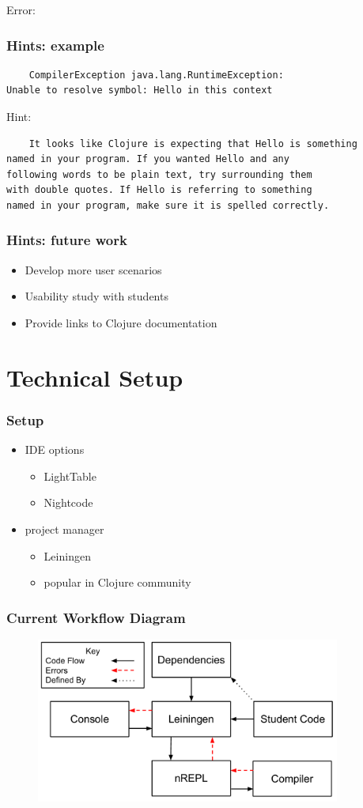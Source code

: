 \documentclass{beamer}
\begin{document}
\begin{frame}[fragile]
Error:
\frametitle{Hints: example}
  	 \begin{verbatim}
	CompilerException java.lang.RuntimeException:
Unable to resolve symbol: Hello in this context
	\end{verbatim}
Hint:
	\begin{verbatim}
	It looks like Clojure is expecting that Hello is something
named in your program. If you wanted Hello and any
following words to be plain text, try surrounding them
with double quotes. If Hello is referring to something
named in your program, make sure it is spelled correctly.
	\end{verbatim}
\end{frame}

\begin{frame}
\frametitle{Hints: future work}
	\begin{itemize}
  	 \item Develop more user scenarios
  	 \item Usability study with students
  	 \item Provide links to Clojure documentation
	 \end{itemize}
\end{frame}
\section{Technical Setup}
\begin{frame}
\frametitle{Setup}
	\begin{itemize}
		\item IDE options
		\begin{itemize}
			\item LightTable
			\item Nightcode
		\end{itemize}
		\item project manager
		\begin{itemize}
			\item Leiningen
			\item popular in Clojure community
		\end{itemize}
	\end{itemize}
\end{frame}

\begin{frame}[fragile]
\frametitle{Current Workflow Diagram}
\begin{figure}[h]
 \includegraphics[width=10cm]{../CurrentErrorHandling.pdf}
 \centering
\end{figure}
\end{frame}
\end{document}
